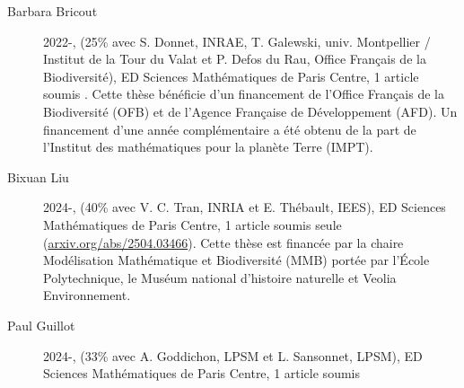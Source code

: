 \begin{description}
  \item[Barbara Bricout] 2022-, (25\% avec S. Donnet, INRAE, T. Galewski, univ. Montpellier / Institut de la Tour du Valat et P. Defos du Rau, Office Français de la Biodiversité), ED Sciences Mathématiques de Paris Centre, 1 article soumis \cite{BDD26}. 
  Cette thèse bénéficie d’un financement de l’Office Français de la Biodiversité (OFB) et de l’Agence Française de Développement (AFD). Un financement d'une année complémentaire a été obtenu de la part de l'Institut des mathématiques pour la planète Terre (IMPT).
  \item[Bixuan Liu] 2024-, (40\% avec V. C. Tran, INRIA et E. Thébault, IEES), ED Sciences Mathématiques de Paris Centre, 1 article soumis seule (\url{arxiv.org/abs/2504.03466}). 
  Cette thèse est financée par la chaire Modélisation Mathématique et Biodiversité (MMB) portée par l’École Polytechnique, le Muséum national d'histoire naturelle et Veolia Environnement.  
  \item[Paul Guillot] 2024-, (33\% avec A. Goddichon, LPSM et L. Sansonnet, LPSM), ED Sciences Mathématiques de Paris Centre, 1 article soumis \cite{GGR26}
\end{description}
